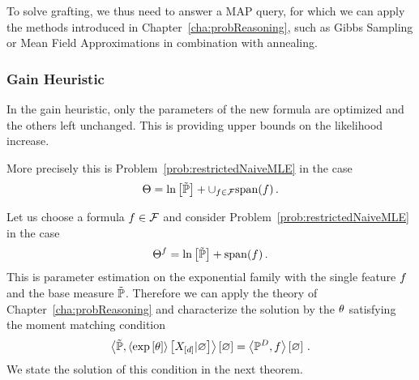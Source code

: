 To solve grafting, we thus need to answer a MAP query, for which we can apply the methods introduced in Chapter~\ref{cha:probReasoning}, such as Gibbs Sampling or Mean Field Approximations in combination with annealing.









\subsubsection{Gain Heuristic}

In the gain heuristic, only the parameters of the new formula are optimized and the others left unchanged.
This is providing upper bounds on the likelihood increase.

More precisely this is Problem~\ref{prob:restrictedNaiveMLE} in the case
\begin{align*}
	\Theta = \ln \left[ \tilde{\mathbb{P}} \right] + \cup_{f\in\mathcal{F}} \mathrm{span}(f) \, . 
\end{align*}


Let us choose a formula $f\in\mathcal{F}$ and consider Problem~\ref{prob:restrictedNaiveMLE}  in the case
\begin{align*}
	\Theta^{f} = \ln \left[ \tilde{\mathbb{P}} \right] + \mathrm{span}(f) \, . 
\end{align*}
This is parameter estimation on the exponential family with the single feature $f$ and the base measure $\tilde{\mathbb{P}}$.
Therefore we can apply the theory of Chapter~\ref{cha:probReasoning} and characterize the solution by the $\theta$ satisfying the moment matching condition
\begin{align*}
	\left\langle \tilde{\mathbb{P}}, \left\langle \mathrm{exp}\left[\theta\right]\right\rangle \left[ X_{[d]} | \varnothing \right] \right\rangle \left[ \varnothing \right] = \left\langle \mathbb{P}^{D}, f\right\rangle \left[ \varnothing \right] \, . 
\end{align*}
We state the solution of this condition in the next theorem.


